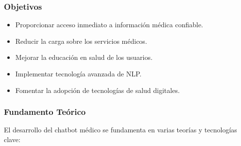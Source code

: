 \subsubsection{Objetivos}
\begin{itemize}
	\item Proporcionar acceso inmediato a información médica confiable.
	\item Reducir la carga sobre los servicios médicos.
	\item Mejorar la educación en salud de los usuarios.
	\item Implementar tecnología avanzada de NLP.
	\item Fomentar la adopción de tecnologías de salud digitales.
\end{itemize}	


\subsubsection{Fundamento Teórico}
El desarrollo del chatbot médico se fundamenta en varias teorías y tecnologías clave:

